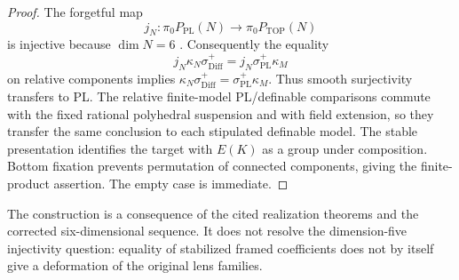 \begin{proof}
The forgetful map
\[
 j_N:\pi_0P_{\mathrm{PL}}(N)\longrightarrow
          \pi_0P_{\mathrm{TOP}}(N)
\]
is injective because $\dim N=6$
\cite[Theorem~6.2, p.~41, and proof pp.~42--43]{BurgheleaLashof1974II}.
Consequently the equality
\[
 j_N\kappa_N\sigma^+_{\mathrm{Diff}}
   =j_N\sigma^+_{\mathrm{PL}}\kappa_M
\]
on relative components implies
$\kappa_N\sigma^+_{\mathrm{Diff}}
 =\sigma^+_{\mathrm{PL}}\kappa_M$.
Thus smooth surjectivity transfers to PL.
The relative finite-model PL/definable comparisons commute with
the fixed rational polyhedral suspension and with field extension,
so they transfer the same conclusion to each stipulated definable
model. The stable presentation identifies the target with $E(K)$
as a group under composition. Bottom fixation prevents permutation
of connected components, giving the finite-product assertion.
The empty case is immediate.
\end{proof}

The construction is a consequence of the cited realization theorems
and the corrected six-dimensional sequence. It does not resolve the
dimension-five injectivity question: equality of stabilized framed
coefficients does not by itself give a deformation of the original
lens families.
